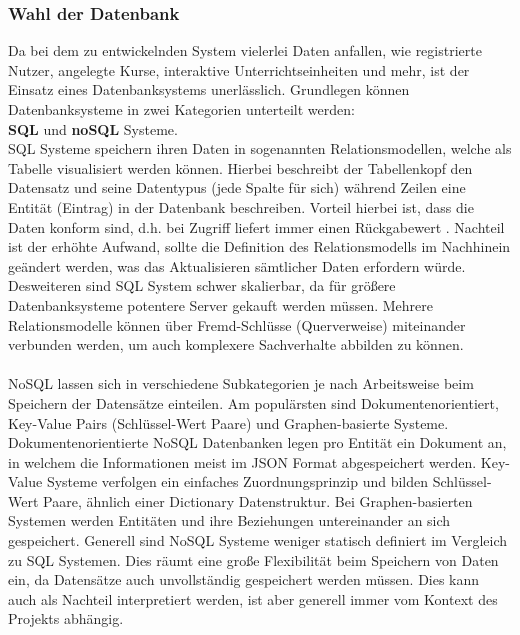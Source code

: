 \subsubsection{Wahl der Datenbank}\label{sec:datenbank}
Da bei dem zu entwickelnden System vielerlei Daten anfallen, wie registrierte Nutzer, angelegte Kurse, interaktive Unterrichtseinheiten und mehr, ist der Einsatz eines Datenbanksystems unerlässlich. Grundlegen können Datenbanksysteme in zwei Kategorien unterteilt werden: \\
\textbf{SQL} und \textbf{noSQL} Systeme. \\ SQL Systeme speichern ihren Daten in sogenannten Relationsmodellen, welche als Tabelle visualisiert werden können. Hierbei beschreibt der Tabellenkopf den Datensatz und seine Datentypus (jede Spalte für sich) während Zeilen eine Entität (Eintrag) in der Datenbank beschreiben. Vorteil hierbei ist, dass die Daten konform sind, d.h. bei Zugriff liefert immer einen Rückgabewert \cite{neumann2015entwicklung}. Nachteil ist der erhöhte Aufwand, sollte die Definition des Relationsmodells im Nachhinein geändert werden, was das Aktualisieren sämtlicher Daten erfordern würde. Desweiteren sind SQL System schwer skalierbar, da für größere Datenbanksysteme potentere Server gekauft werden müssen. Mehrere Relationsmodelle können über Fremd-Schlüsse (Querverweise) miteinander verbunden werden, um auch komplexere Sachverhalte abbilden zu können. \\ \\ NoSQL lassen sich in verschiedene Subkategorien je nach Arbeitsweise beim Speichern der Datensätze einteilen\cite{neumann2015entwicklung}. Am populärsten sind Dokumentenorientiert, Key-Value Pairs (Schlüssel-Wert Paare) und Graphen-basierte Systeme. Dokumentenorientierte NoSQL Datenbanken legen pro Entität ein Dokument an, in welchem die Informationen meist im JSON Format abgespeichert werden. Key-Value Systeme verfolgen ein einfaches Zuordnungsprinzip und bilden Schlüssel-Wert Paare, ähnlich einer Dictionary Datenstruktur. Bei Graphen-basierten Systemen werden Entitäten und ihre Beziehungen untereinander an sich gespeichert. Generell sind NoSQL Systeme weniger statisch definiert im Vergleich zu SQL Systemen. Dies räumt eine große Flexibilität beim Speichern von Daten ein, da Datensätze auch unvollständig gespeichert werden müssen. Dies kann auch als Nachteil interpretiert werden, ist aber generell immer vom Kontext des Projekts abhängig. \\ \\    

